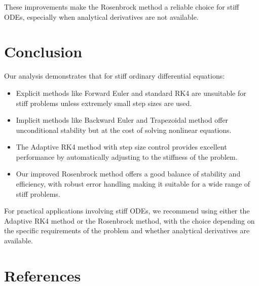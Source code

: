\documentclass[11pt,a4paper]{article}
\begin{document}
These improvements make the Rosenbrock method a reliable choice for stiff ODEs, especially when analytical derivatives are not available.

\section{Conclusion}

Our analysis demonstrates that for stiff ordinary differential equations:

\begin{itemize}
    \item Explicit methods like Forward Euler and standard RK4 are unsuitable for stiff problems unless extremely small step sizes are used.
    
    \item Implicit methods like Backward Euler and Trapezoidal method offer unconditional stability but at the cost of solving nonlinear equations.
    
    \item The Adaptive RK4 method with step size control provides excellent performance by automatically adjusting to the stiffness of the problem.
    
    \item Our improved Rosenbrock method offers a good balance of stability and efficiency, with robust error handling making it suitable for a wide range of stiff problems.
\end{itemize}

For practical applications involving stiff ODEs, we recommend using either the Adaptive RK4 method or the Rosenbrock method, with the choice depending on the specific requirements of the problem and whether analytical derivatives are available.

\section{References}
\end{document}
